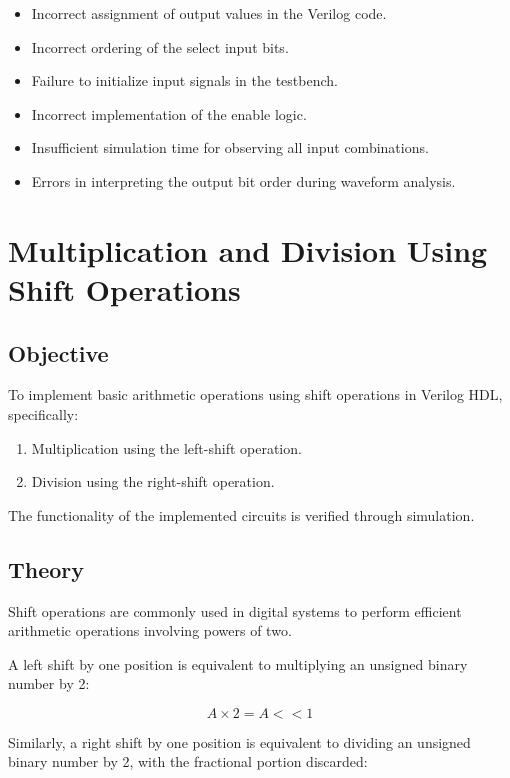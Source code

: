 \documentclass[12pt,a4paper]{report}
\begin{document}
\begin{itemize}
    \item Incorrect assignment of output values in the Verilog code.
    \item Incorrect ordering of the select input bits.
    \item Failure to initialize input signals in the testbench.
    \item Incorrect implementation of the enable logic.
    \item Insufficient simulation time for observing all input combinations.
    \item Errors in interpreting the output bit order during waveform analysis.
\end{itemize}
\chapter{Multiplication and Division Using Shift Operations}
\label{ch:pdf13}

\section{Objective}

To implement basic arithmetic operations using shift operations in Verilog HDL, specifically:
\begin{enumerate}
    \item Multiplication using the left-shift operation.
    \item Division using the right-shift operation.
\end{enumerate}

The functionality of the implemented circuits is verified through simulation.

\section{Theory}

Shift operations are commonly used in digital systems to perform efficient arithmetic operations involving powers of two.

A left shift by one position is equivalent to multiplying an unsigned binary number by 2:

\[
A \times 2 = A << 1
\]

Similarly, a right shift by one position is equivalent to dividing an unsigned binary number by 2, with the fractional portion discarded:
\end{document}
